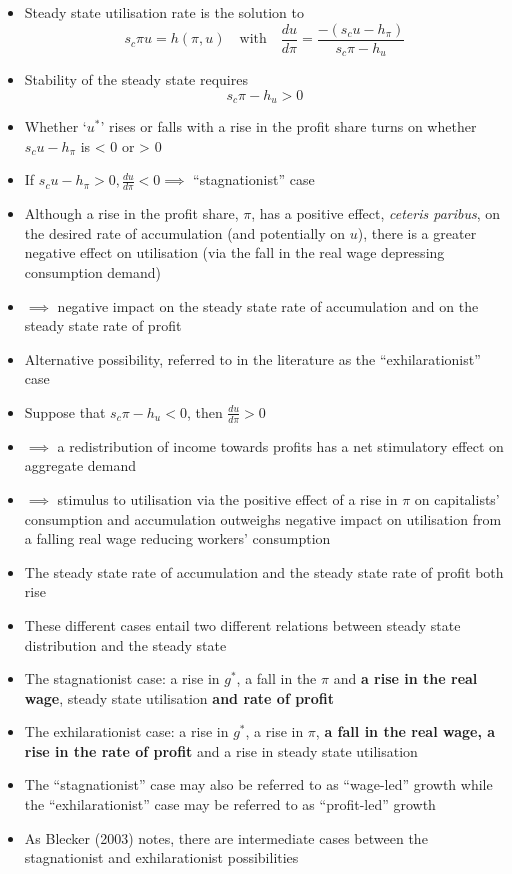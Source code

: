 \documentclass{article}
\begin{document}
\begin{itemize}
		\item  Steady state utilisation rate is the solution to
		\begin{equation}
			s_c\pi u = h(\pi,u) \quad\text{with}\quad \frac{du}{d\pi} = \frac{-\left( s_cu-h_{\pi} \right)}{s_c\pi-h_u} \label{eq:4.33}
		\end{equation}
		\item Stability of the steady state requires
		\[
			s_c\pi-h_u>0
		\]
		\item Whether `\( u^* \)' rises or falls with a rise in the profit share turns on whether \( s_c u-h_{\pi} \) is < 0 or > 0
		\item If \( s_c u-h_{\pi} > 0, \frac{du}{d\pi}<0 \implies \) ``stagnationist'' case
		\item Although a rise in the profit share, \( \pi \), has a positive effect, \textit{ceteris paribus}, on the desired rate of accumulation (and potentially on \( u \)), there is a greater negative effect on utilisation (via the fall in the real wage depressing consumption demand)
		\item \( \implies \) negative impact on the steady state rate of accumulation and on the steady state rate of profit
		\item Alternative possibility, referred to in the literature as the ``exhilarationist'' case
		\item Suppose that \( s_c\pi-h_u<0 \), then \( \frac{du}{d\pi}>0 \)
		\item \( \implies \) a redistribution of income towards profits has a net stimulatory effect on aggregate demand
		\item \( \implies \) stimulus to utilisation via the positive effect of a rise in \( \pi \) on capitalists' consumption and accumulation outweighs negative impact on utilisation from a falling real wage reducing workers' consumption
		\item The steady state rate of accumulation and the steady state rate of profit both rise
		\item These different cases entail two different relations between steady state distribution and the steady state
		\item The stagnationist case: a rise in \( g^* \), a fall in the \( \pi \) and \textbf{a rise in the real wage}, steady state utilisation \textbf{and rate of profit}
		\item The exhilarationist case: a rise in \( g^* \), a rise in \( \pi \), \textbf{a fall in the real wage, a rise in the rate of profit} and a rise in steady state utilisation
		\item The ``stagnationist'' case may also be referred to as ``wage-led'' growth while the ``exhilarationist'' case may be referred to as ``profit-led'' growth
		\item As Blecker (2003) notes, there are intermediate cases between the stagnationist and exhilarationist possibilities 
	\end{itemize}
\pagebreak
\end{document}
